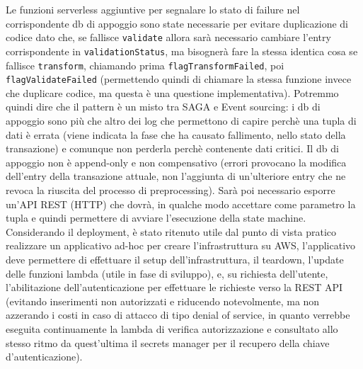 \documentclass[
    sigconf, 
    screen=false, 
    acmthm=false, 
    nonacm
]{acmart}
\begin{document}
Le funzioni serverless aggiuntive per segnalare lo stato di failure nel corrispondente db di appoggio sono state 
necessarie per evitare duplicazione di 
codice dato che, se fallisce \texttt{validate} allora sarà necessario cambiare l'entry corrispondente in \texttt{validationStatus},
ma bisognerà fare la stessa identica cosa se fallisce \texttt{transform}, chiamando prima \texttt{flagTransformFailed}, poi 
\texttt{flagValidateFailed} (permettendo quindi di chiamare la stessa
funzione invece che duplicare codice, ma questa è una questione implementativa).
Potremmo quindi dire che il pattern è un misto tra SAGA e Event sourcing: i db di appoggio sono più che altro
dei log che permettono di capire perchè una tupla di dati è errata (viene indicata la fase che ha causato 
fallimento, nello stato della transazione) e comunque non perderla perchè contenente dati
critici. Il db di appoggio non è append-only e non compensativo (errori provocano la modifica dell'entry della 
transazione attuale, non l'aggiunta di un'ulteriore entry che ne revoca la riuscita del processo di preprocessing).
Sarà poi necessario esporre un'API REST (HTTP) che dovrà, in qualche modo accettare come parametro la tupla e quindi 
permettere di avviare l'esecuzione della state machine.
Considerando il deployment, è stato ritenuto utile dal punto di vista pratico realizzare un applicativo ad-hoc per 
creare l'infrastruttura su AWS, l'applicativo deve permettere di effettuare il setup dell'infrastruttura,
il teardown, l'update delle funzioni lambda (utile in fase di sviluppo), e, su richiesta dell'utente, l'abilitazione
dell'autenticazione per effettuare le richieste verso la REST API (evitando inserimenti non autorizzati e riducendo 
notevolmente, ma non azzerando i costi in caso di attacco di tipo denial of service, in quanto verrebbe eseguita 
continuamente la lambda di verifica autorizzazione e consultato allo stesso ritmo da quest'ultima il secrets 
manager per il recupero della chiave d'autenticazione).
\end{document}
